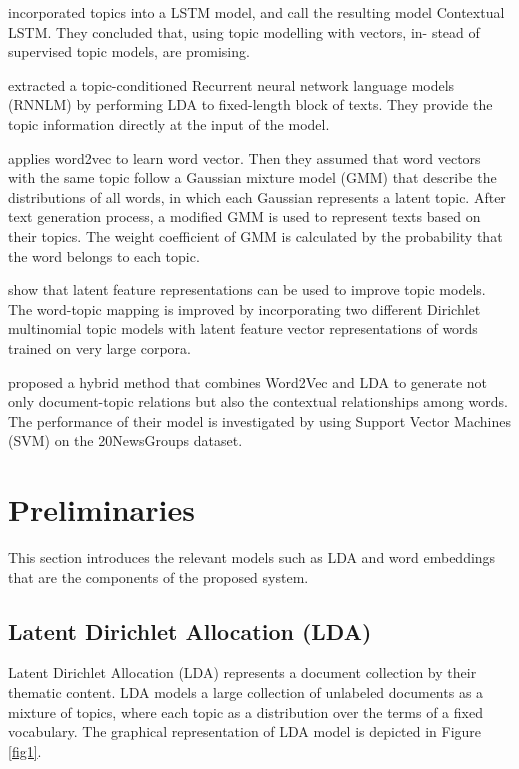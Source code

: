 \documentclass[a4paper,fleqn]{cas-dc}
\begin{document}
\cite{ref13} incorporated topics into a LSTM model, and call the resulting model Contextual LSTM. They concluded that, using topic modelling with vectors, in- stead of supervised topic models, are promising. 

\cite{ref14} extracted a topic-conditioned Recurrent neural network language models (RNNLM) by performing LDA to fixed-length block of texts. They provide the topic information directly at the input of the model.

\cite{ref1} applies word2vec to learn word vector. Then they assumed that word vectors with the same topic follow a Gaussian mixture model (GMM) that describe the distributions of all words, in which each Gaussian represents a latent topic. After text generation process, a modified GMM is used to represent texts based on their topics. The weight coefficient of GMM is calculated by the probability that the word belongs to each topic. 

\cite{ref15} show that latent feature representations can be used to improve topic models. The word-topic mapping is improved by incorporating two different Dirichlet multinomial topic models with latent feature vector representations of words trained on very large corpora.

\cite{ref16} proposed a hybrid method that combines Word2Vec and LDA to generate not only document-topic relations but also the contextual relationships among words. The performance of their model is investigated by using Support Vector Machines (SVM) on the 20NewsGroups dataset.

\section{Preliminaries}

This section introduces the relevant models such as LDA and word embeddings that are the components of the proposed system. 

\subsection{Latent Dirichlet Allocation (LDA)}

Latent Dirichlet Allocation (LDA)  \citep{ref17,ref5}  represents a document collection by their thematic content. LDA models a large collection of unlabeled documents as a mixture of topics, where each topic as a distribution over the terms of a fixed vocabulary. The graphical representation of LDA model is depicted in Figure \ref{fig1}.
\end{document}
